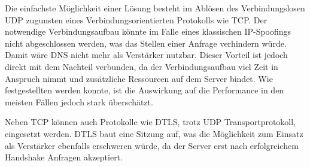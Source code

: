 Die einfachste Möglichkeit einer Lösung besteht im Ablösen des Verbindungslosen UDP zugunsten eines Verbindungsorientierten Protokolls wie TCP. Der notwendige Verbindungsaufbau könnte im Falle eines klassischen IP-Spoofings nicht abgeschlossen werden, was das Stellen einer Anfrage verhindern würde. Damit wäre DNS nicht mehr als Verstärker nutzbar. Dieser Vorteil ist jedoch direkt mit dem Nachteil verbunden, da der Verbindungsaufbau viel Zeit in Anspruch nimmt und zusätzliche Ressourcen auf dem Server bindet. Wie festgestellten werden konnte, ist die Auswirkung auf die Performance in den meisten Fällen jedoch stark überschätzt\cite{Zhu2015}.

Neben TCP können auch Protokolle wie DTLS, trotz UDP Transportprotokoll, eingesetzt werden. DTLS baut eine Sitzung auf, was die Möglichkeit zum Einsatz als Verstärker ebenfalls erschweren würde, da der Server erst nach erfolgreichem Handshake Anfragen akzeptiert\cite{rfc6347}. 
